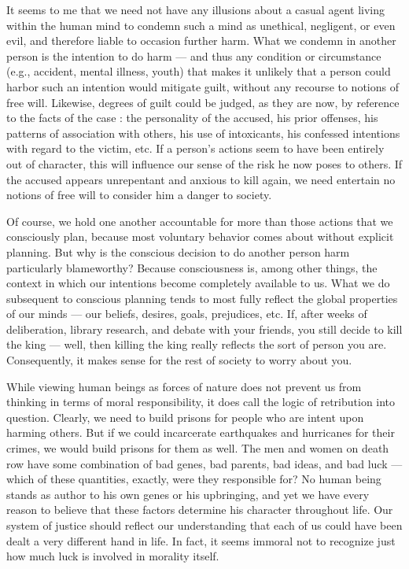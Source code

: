 \documentclass[a4paper,14pt]{extbook}
\begin{document}
It seems to me that we need not have any illusions about a casual agent living within the human mind to condemn such a mind as unethical, negligent, or even evil, and therefore liable to occasion further harm.
What we condemn in another person is the intention to do harm --- and thus any condition or circumstance (e.g., accident, mental illness, youth) that makes it unlikely that a person could harbor such an intention would mitigate guilt, without any recourse to notions of free will.
Likewise, degrees of guilt could be judged, as they are now, by reference to the facts of the case :
the personality of the accused, his prior offenses, his patterns of association with others, his use of intoxicants, his confessed intentions with regard to the victim, etc.
If a person’s actions seem to have been entirely out of character, this will influence our sense of the risk he now poses to others.
If the accused appears unrepentant and anxious to kill again, we need entertain no notions of free will to consider him a danger to society.

Of course, we hold one another accountable for more than those actions that we consciously plan, because most voluntary behavior comes about without explicit planning.
But why is the conscious decision to do another person harm particularly blameworthy?
Because consciousness is, among other things, the context in which our intentions become completely available to us.
What we do subsequent to conscious planning tends to most fully reflect the global properties of our minds --- our beliefs, desires, goals, prejudices, etc.
If, after weeks of deliberation, library research, and debate with your friends, you still decide to kill the king --- well, then killing the king really reflects the sort of person you are.
Consequently, it makes sense for the rest of society to worry about you.

While viewing human beings as forces of nature does not prevent us from thinking in terms of moral responsibility, it does call the logic of retribution into question.
Clearly, we need to build prisons for people who are intent upon harming others.
But if we could incarcerate earthquakes and hurricanes for their crimes, we would build prisons for them as well.
The men and women on death row have some combination of bad genes, bad parents, bad ideas, and bad luck --- which of these quantities, exactly, were they responsible for?
No human being stands as author to his own genes or his upbringing, and yet we have every reason to believe that these factors determine his character throughout life.
Our system of justice should reflect our understanding that each of us could have been dealt a very different hand in life.
In fact, it seems immoral not to recognize just how much luck is involved in morality itself.
\end{document}
